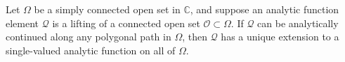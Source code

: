 Let $\Omega$ be a simply connected open set in $\mathbb{C}$, and suppose an analytic function element $\mathcal{Q}$ is a lifting of a connected open set $\mathcal{O} \subset \Omega$. If $\mathcal{Q}$ can be analytically continued along any polygonal path in $\Omega$, then $\mathcal{Q}$ has a unique extension to a single-valued analytic function on all of $\Omega$.
